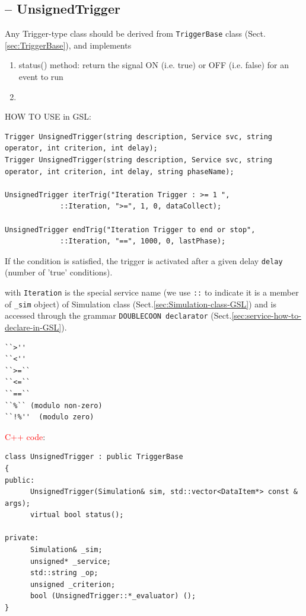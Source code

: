 \subsection{-- UnsignedTrigger}
\label{sec:UnsignedTrigger}

Any Trigger-type class should be derived from \verb!TriggerBase! class
(Sect.\ref{sec:TriggerBase}), and implements
\begin{enumerate}
  \item  status() method: return the signal ON (i.e. true) or OFF (i.e. false)
  for an event to run
  
  \item
\end{enumerate}

HOW TO USE in GSL:
{\tiny
\begin{verbatim}
Trigger UnsignedTrigger(string description, Service svc, string operator, int criterion, int delay);
Trigger UnsignedTrigger(string description, Service svc, string operator, int criterion, int delay, string phaseName);

UnsignedTrigger iterTrig("Iteration Trigger : >= 1 ", 
 			 ::Iteration, ">=", 1, 0, dataCollect);

UnsignedTrigger endTrig("Iteration Trigger to end or stop", 
			 ::Iteration, "==", 1000, 0, lastPhase); 

\end{verbatim}
}
If the condition is satisfied, the trigger is activated after a given
delay \verb!delay! (number of 'true' conditions). 

 with \verb!Iteration! is the special service name (we use \verb!::!
to indicate it is a member of \verb!_sim! object) of Simulation class
(Sect.\ref{sec:Simulation-class-GSL}) and is accessed through the grammar
\verb!DOUBLECOON declarator! (Sect.\ref{sec:service-how-to-declare-in-GSL}).
\begin{verbatim}
``>''
``<''
``>=``
``<=``
``==``
``%`` (modulo non-zero)
``!%''  (modulo zero)
\end{verbatim}

\textcolor{red}{C++ code}: 
{\tiny
\begin{verbatim}
class UnsignedTrigger : public TriggerBase
{
public:
      UnsignedTrigger(Simulation& sim, std::vector<DataItem*> const & args);
      virtual bool status();

private:
      Simulation& _sim;
      unsigned* _service;
      std::string _op;
      unsigned _criterion;
      bool (UnsignedTrigger::*_evaluator) ();
}
\end{verbatim}
}

